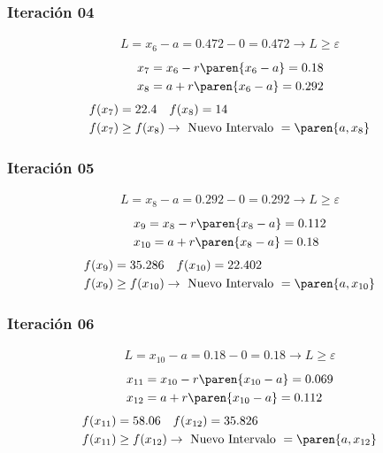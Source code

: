 \begin{homeworkProblem}
\subsubsection{Iteración 04}
\begin{align*}
    L=x_6-a=0.472-0=0.472 \rightarrow L \geq \varepsilon
\end{align*}
\begin{align*}
    &x_7=x_6 - r\paren{x_6-a}= 0.18 \\
    &x_8=a + r\paren{x_6-a}= 0.292
\end{align*}
\begin{align*}
    &f(x_7)=22.4 \quad f(x_8)=14 \\
    &f(x_7) \geq f(x_8) \rightarrow \text{ Nuevo Intervalo } = \paren{a,x_8}
\end{align*}

\subsubsection{Iteración 05}
\begin{align*}
    L=x_8-a=0.292-0=0.292 \rightarrow L \geq \varepsilon
\end{align*}
\begin{align*}
    &x_9=x_8 - r\paren{x_8-a}= 0.112\\
    &x_{10}=a + r\paren{x_8-a}= 0.18
\end{align*}
\begin{align*}
    &f(x_9)=35.286 \quad f(x_{10})=22.402 \\
    &f(x_9) \geq f(x_{10}) \rightarrow \text{ Nuevo Intervalo } = \paren{a,x_{10}}
\end{align*}


\subsubsection{Iteración 06}
\begin{align*}
    L=x_{10}-a=0.18-0=0.18 \rightarrow L \geq \varepsilon
\end{align*}
\begin{align*}
    &x_{11}=x_{10} - r\paren{x_{10}-a}= 0.069\\
    &x_{12}=a + r\paren{x_{10}-a}= 0.112
\end{align*}
\begin{align*}
    &f(x_{11})=58.06 \quad f(x_{12})=35.826 \\
    &f(x_{11}) \geq f(x_{12}) \rightarrow \text{ Nuevo Intervalo } = \paren{a,x_{12}}
\end{align*}


\end{homeworkProblem}
